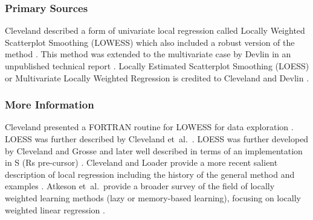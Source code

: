 \subsubsection{Primary Sources}
Cleveland described a form of univariate local regression called Locally Weighted Scatterplot Smoothing (LOWESS) which also included a robust version of the method \cite{Cleveland1978, Cleveland1979}. 
This method was extended to the multivariate case by Devlin in an unpublished technical report \cite{Devlin1986}.
Locally Estimated Scatterplot Smoothing (LOESS) or Multivariate Locally Weighted Regression is credited to Cleveland and Devlin \cite{Cleveland1988}.

\subsubsection{More Information}
Cleveland presented a FORTRAN routine for LOWESS for data exploration \cite{Cleveland1981}.
LOESS was further described by Cleveland et~al.\ \cite{Cleveland1988a}.
LOESS was further developed by Cleveland and Grosse \cite{Cleveland1991} and later well described in terms of an implementation in S (Rs pre-cursor) \cite{Cleveland1992}.
Cleveland and Loader provide a more recent salient description of local regression including the history of the general method and examples \cite{Cleveland1996}.
Atkeson et~al.\ provide a broader survey of the field of locally weighted learning methods (lazy or memory-based learning), focusing on locally weighted linear regression \cite{Atkeson1997}.

